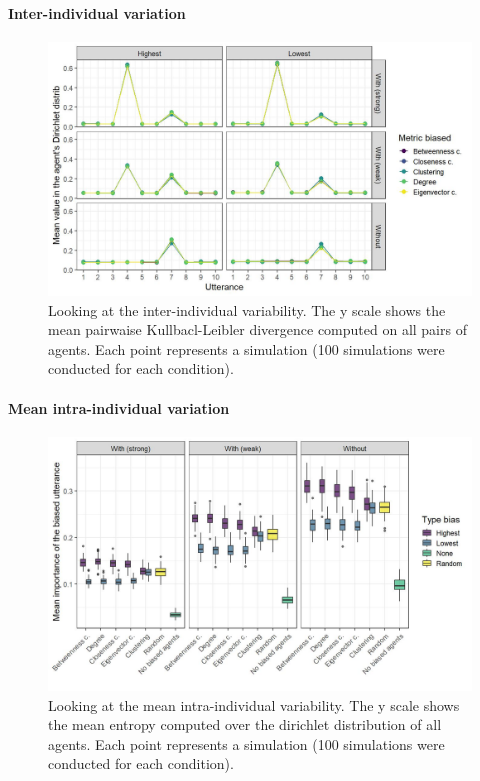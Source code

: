\documentclass[
]{article}
\begin{document}
\hypertarget{inter-individual-variation-3}{%
\paragraph{Inter-individual
variation}\label{inter-individual-variation-3}}

\begin{figure}[!H]

{\centering \includegraphics{./Figures/unnamed-chunk-213-1} 

}

\caption{Looking at the inter-individual variability. The y scale shows the mean pairwaise Kullbacl-Leibler divergence computed on all pairs of agents. Each point represents a simulation (100 simulations were conducted for each condition).}\label{fig:unnamed-chunk-213}
\end{figure}

\hypertarget{mean-intra-individual-variation-3}{%
\paragraph{Mean intra-individual
variation}\label{mean-intra-individual-variation-3}}

\begin{figure}[!H]

{\centering \includegraphics{./Figures/unnamed-chunk-214-1} 

}

\caption{Looking at the mean intra-individual variability. The y scale shows the mean entropy computed over the dirichlet distribution of all agents. Each point represents a simulation (100 simulations were conducted for each condition).}\label{fig:unnamed-chunk-214}
\end{figure}
\end{document}
